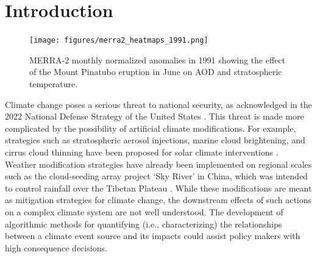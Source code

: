 \documentclass[AMS,STIX2COL]{WileyNJD-v2}
\begin{document}


\maketitle

\section{Introduction}

\begin{figure}[h]
    \centering
    \texttt{[image: figures/merra2\_heatmaps\_1991.png]}
    \caption{MERRA-2 monthly normalized anomalies in 1991 showing the effect of the Mount Pinatubo eruption in June on AOD and stratospheric temperature.}
    \label{fig:merra2heatmap}
\end{figure}

Climate change poses a serious threat to national security, as acknowledged in the 2022 National Defense Strategy of the United States \citep{nds2022}. This threat is made more complicated by the possibility of artificial climate modifications. For example, strategies such as stratospheric aerosol injections, marine cloud brightening, and cirrus cloud thinning have been proposed for solar climate interventions \citep{eastham2021}. Weather modification strategies have already been implemented on regional scales such as the cloud-seeding array project `Sky River' in China, which was intended to control rainfall over the Tibetan Plateau \citep{watts2020}. While these modifications are meant as mitigation strategies for climate change, the downstream effects of such actions on a complex climate system are not well understood. The development of algorithmic methods for quantifying (i.e., characterizing) the relationships between a climate event source and its impacts could assist policy makers with high consequence decisions.
\end{document}
